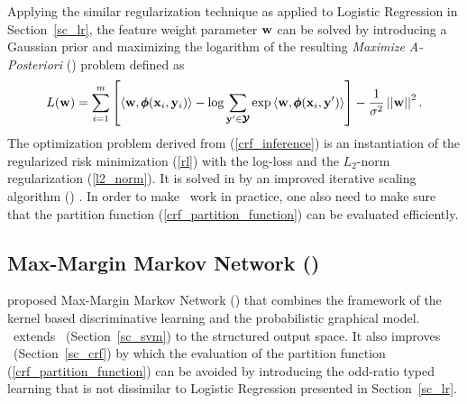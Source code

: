 {Applying the similar regularization technique as applied to Logistic Regression in Section~\ref{sc_lr}, the feature weight parameter $\mathbf {w}$ can be solved by introducing a Gaussian prior and maximizing the logarithm of the resulting \textit{Maximize A-Posteriori} (\map) problem \citep{taskar02} defined as
\begin{align}
	L(\mathbf {w}) = \sum_{i=1}^{m}\left[\langle \mathbf {w}, \pmb \phi(\mathbf {x}_i,\mathbf {y}_i) \rangle-\log{\sum_{\mathbf {y}'\in\pmb {\mathcal{Y}}}{\exp{\langle \mathbf {w}, \pmb \phi(\mathbf {x}_i,\mathbf {y}') \rangle}}}\right] - \frac{1}{\sigma^2}\left|\left| \mathbf {w} \right|\right|^2. \label{crf_inference}
\end{align}
The optimization problem derived from (\ref{crf_inference}) is an instantiation of the regularized risk minimization (\ref{rl}) with the log-loss and the $L_2$-norm regularization (\ref{l2_norm}).
It is solved in \citep{lafferty01} by an improved iterative scaling algorithm (\iis) \citep{Pietra97inducing}.
In order to make \crf\ work in practice, one also need to make sure that the partition function (\ref{crf_partition_function}) can be evaluated efficiently.



%
% 
\subsection{Max-Margin Markov Network (\mmmn)} \label{sc_mmmn}

\citet{Taskar04max} proposed Max-Margin Markov Network (\mmmn) that combines the framework of the kernel based discriminative learning and the probabilistic graphical model.
\mmmn\ extends \svm\ (Section~\ref{sc_svm}) to the structured output space.
It also improves \crf\ (Section~\ref{sc_crf}) by which the evaluation of the partition function (\ref{crf_partition_function}) can be avoided by introducing the odd-ratio typed learning that is not dissimilar to Logistic Regression presented in Section~\ref{sc_lr}.

}
